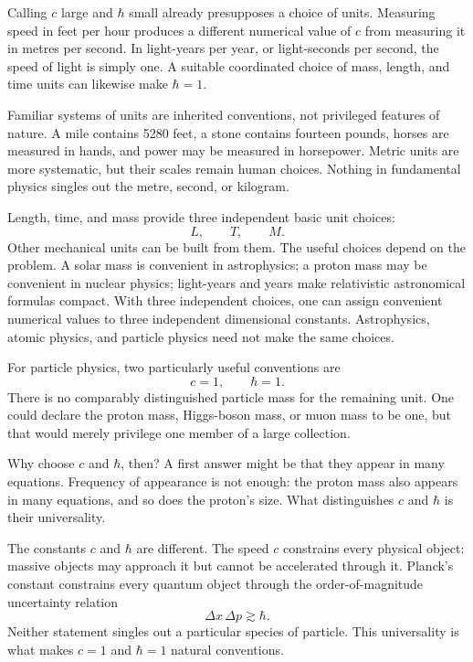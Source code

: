 Calling \(c\) large and \(\hbar\) small already presupposes a choice of units. Measuring speed in feet per hour produces a different numerical value of \(c\) from measuring it in metres per second. In light-years per year, or light-seconds per second, the speed of light is simply one. A suitable coordinated choice of mass, length, and time units can likewise make \(\hbar=1\).

Familiar systems of units are inherited conventions, not privileged features of nature. A mile contains 5280 feet, a stone contains fourteen pounds, horses are measured in hands, and power may be measured in horsepower. Metric units are more systematic, but their scales remain human choices. Nothing in fundamental physics singles out the metre, second, or kilogram.

Length, time, and mass provide three independent basic unit choices:
\begin{equation}
L,\qquad T,\qquad M.
\end{equation}
Other mechanical units can be built from them. The useful choices depend on the problem. A solar mass is convenient in astrophysics; a proton mass may be convenient in nuclear physics; light-years and years make relativistic astronomical formulas compact. With three independent choices, one can assign convenient numerical values to three independent dimensional constants. Astrophysics, atomic physics, and particle physics need not make the same choices.

For particle physics, two particularly useful conventions are
\begin{equation}
c=1,
\qquad
\hbar=1.
\end{equation}
There is no comparably distinguished particle mass for the remaining unit. One could declare the proton mass, Higgs-boson mass, or muon mass to be one, but that would merely privilege one member of a large collection.

Why choose \(c\) and \(\hbar\), then? A first answer might be that they appear in many equations. Frequency of appearance is not enough: the proton mass also appears in many equations, and so does the proton's size. What distinguishes \(c\) and \(\hbar\) is their universality.

The constants \(c\) and \(\hbar\) are different. The speed \(c\) constrains every physical object: massive objects may approach it but cannot be accelerated through it. Planck's constant constrains every quantum object through the order-of-magnitude uncertainty relation
\begin{equation}
\Delta x\,\Delta p\gtrsim\hbar.
\end{equation}
Neither statement singles out a particular species of particle. This universality is what makes \(c=1\) and \(\hbar=1\) natural conventions.

